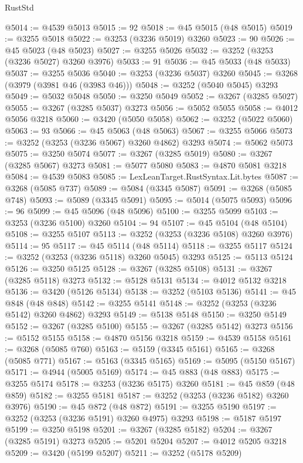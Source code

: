 \begin{lexlean}{RustStd}
\begin{coremodule}
{\begin{coremodule}
{{{{{{{{{{{{{{{{{{{{{{{{{{{{{{{{{{{{{{{@5014 := @4539 @5013
@5015 := 92
@5018 := @45 @5015 (@48 @5015)
@5019 := @3255 @5018
@5022 := @3253 (@3236 @5019) @3260
@5023 := 90
@5026 := @45 @5023 (@48 @5023)
@5027 := @3255 @5026
@5032 := @3252 (@3253 (@3236 @5027) @3260 @3976)
@5033 := 91
@5036 := @45 @5033 (@48 @5033)
@5037 := @3255 @5036
@5040 := @3253 (@3236 @5037) @3260
@5045 := @3268 (@3979 (@3981 @46 (@3983 @46)))
@5048 := @3252 (@5040 @5045) @3293
@5049 := @5032 @5048
@5050 := @3250 @5049
@5052 := @3267 (@3285 @5027)
@5055 := @3267 (@3285 @5037) @3273
@5056 := @5052 @5055
@5058 := @4012 @5056 @3218
@5060 := @3420 (@5050 @5058)
@5062 := @3252 (@5022 @5060)
@5063 := 93
@5066 := @45 @5063 (@48 @5063)
@5067 := @3255 @5066
@5073 := @3252 (@3253 (@3236 @5067) @3260 @4862) @3293
@5074 := @5062 @5073
@5075 := @3250 @5074
@5077 := @3267 (@3285 @5019)
@5080 := @3267 (@3285 @5067) @3273
@5081 := @5077 @5080
@5083 := @4870 @5081 @3218
@5084 := @4539 @5083
@5085 := LexLeanTarget.RustSyntax.Lit.bytes
@5087 := @3268 (@5085 @737)
@5089 := @5084 (@3345 @5087)
@5091 := @3268 (@5085 @748)
@5093 := @5089 (@3345 @5091)
@5095 := @5014 (@5075 @5093)
@5096 := 96
@5099 := @45 @5096 (@48 @5096)
@5100 := @3255 @5099
@5103 := @3253 (@3236 @5100) @3260
@5104 := 94
@5107 := @45 @5104 (@48 @5104)
@5108 := @3255 @5107
@5113 := @3252 (@3253 (@3236 @5108) @3260 @3976)
@5114 := 95
@5117 := @45 @5114 (@48 @5114)
@5118 := @3255 @5117
@5124 := @3252 (@3253 (@3236 @5118) @3260 @5045) @3293
@5125 := @5113 @5124
@5126 := @3250 @5125
@5128 := @3267 (@3285 @5108)
@5131 := @3267 (@3285 @5118) @3273
@5132 := @5128 @5131
@5134 := @4012 @5132 @3218
@5136 := @3420 (@5126 @5134)
@5138 := @3252 (@5103 @5136)
@5141 := @45 @848 (@48 @848)
@5142 := @3255 @5141
@5148 := @3252 (@3253 (@3236 @5142) @3260 @4862) @3293
@5149 := @5138 @5148
@5150 := @3250 @5149
@5152 := @3267 (@3285 @5100)
@5155 := @3267 (@3285 @5142) @3273
@5156 := @5152 @5155
@5158 := @4870 @5156 @3218
@5159 := @4539 @5158
@5161 := @3268 (@5085 @760)
@5163 := @5159 (@3345 @5161)
@5165 := @3268 (@5085 @771)
@5167 := @5163 (@3345 @5165)
@5169 := @5095 (@5150 @5167)
@5171 := @4944 (@5005 @5169)
@5174 := @45 @883 (@48 @883)
@5175 := @3255 @5174
@5178 := @3253 (@3236 @5175) @3260
@5181 := @45 @859 (@48 @859)
@5182 := @3255 @5181
@5187 := @3252 (@3253 (@3236 @5182) @3260 @3976)
@5190 := @45 @872 (@48 @872)
@5191 := @3255 @5190
@5197 := @3252 (@3253 (@3236 @5191) @3260 @4975) @3293
@5198 := @5187 @5197
@5199 := @3250 @5198
@5201 := @3267 (@3285 @5182)
@5204 := @3267 (@3285 @5191) @3273
@5205 := @5201 @5204
@5207 := @4012 @5205 @3218
@5209 := @3420 (@5199 @5207)
@5211 := @3252 (@5178 @5209)
}}}}}}}}}}}}}}}}}}}}}}}}}}}}}}}}}}}}}}}
\end{coremodule}}
\end{coremodule}
\end{lexlean}
